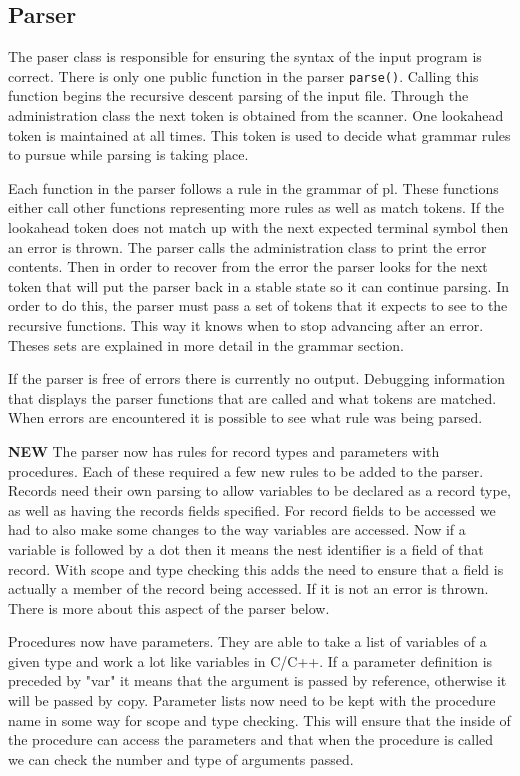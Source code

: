 \documentclass{article}
\begin{document}
\subsection{Parser}
The paser class is responsible for ensuring the syntax of the input program is correct.
There is only one public function in the parser \verb|parse()|. Calling this function begins
the recursive descent parsing of the input file. Through the administration class the next
token is obtained from the scanner. One lookahead token is maintained at all times. This token
is used to decide what grammar rules to pursue while parsing is taking place.

Each function in the parser follows a rule in the grammar
of pl. These functions either call other functions representing more rules as well as match
tokens. If the lookahead token does not match up with the next expected terminal symbol then an
error is thrown. The parser calls the administration class to print the error contents. Then in
order to recover from the error the parser looks for the next token that will put the parser back
in a stable state so it can continue parsing. In order to do this, the parser must pass a set of
tokens that it expects to see to the recursive functions. This way it knows when to stop
advancing after an error. Theses sets are explained in more detail in the grammar section.

If the parser is free of errors there is currently no output. Debugging information that displays
the parser functions that are called and what tokens are matched. When errors are encountered
it is possible to see what rule was being parsed.

\textbf{NEW} The parser now has rules for record types and parameters with procedures. Each of these
required a few new rules to be added to the parser. Records need their own parsing to
allow variables to be declared as a record type, as well as having the records fields
specified. For record fields to be accessed we had to also make some changes to the
way variables are accessed. Now if a variable is followed by a dot then it means the
nest identifier is a field of that record. With scope and type checking this adds the need
to ensure that a field is actually a member of the record being accessed. If it is not an
error is thrown. There is more about this aspect of the parser below.

Procedures now have parameters. They are able to take a list of variables of a given type
and work a lot like variables in C/C++. If a parameter definition is preceded by "var" it
means that the argument is passed by reference, otherwise it will be passed by copy.
Parameter lists now need to be kept with the procedure name in some way for scope and
type checking. This will ensure that the inside of the procedure can access the parameters
and that when the procedure is called we can check the number and type of arguments passed.
\end{document}
